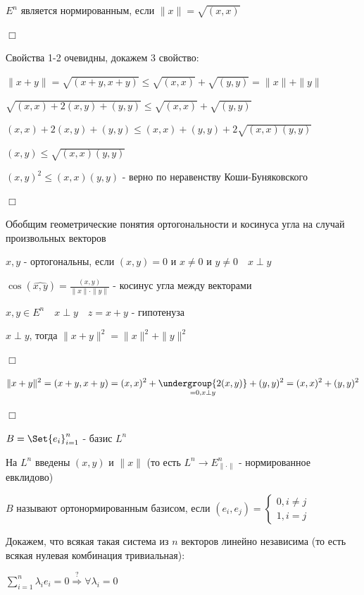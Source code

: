 \documentclass[12pt]{article}
\begin{document}
    \Th $\displaystyle E^n$ является нормированным, если $\|x\| = \sqrt{(x, x)}$

    $\Box$

    Свойства 1-2 очевидны, докажем 3 свойство:

    $\|x + y\| = \sqrt{(x + y, x + y)} \leq \sqrt{(x, x)} + \sqrt{(y, y)} = \|x\| + \|y\|$

    $\sqrt{(x, x) + 2(x, y) + (y, y)} \leq \sqrt{(x, x)} + \sqrt{(y, y)}$

    $(x, x) + 2(x, y) + (y, y) \leq (x, x) + (y, y) + 2\sqrt{(x, x)(y, y)}$

    $(x, y) \leq \sqrt{(x, x)(y, y)}$

    $\displaystyle (x, y)^2 \leq (x, x)(y, y)$ - верно по неравенству Коши-Буняковского

    $\Box$

    Обобщим геометрические понятия ортогональности и косинуса угла на случай произвольных векторов

    \Def $x, y$ - ортогональны, если $(x, y) = 0$ и $x \neq 0$ и $y \neq 0 \quad x \perp y$

    \Def $\displaystyle \cos(\widehat{x, y}) = \frac{(x, y)}{\|x\|\cdot\|y\|}$ - косинус угла между векторами

    \Def $\displaystyle x, y \in E^n \quad x \perp y \quad z = x + y$ - гипотенуза

    \Th $x \perp y$, тогда $\displaystyle \|x + y\|^2 = \|x\|^2 + \|y\|^2$

    $\Box$

    $\displaystyle \|x + y\|^2 = (x + y, x + y) = (x, x)^2 + \underset{= 0, x \perp y}{\undergroup{2(x, y)}} + (y, y)^2 = (x, x)^2 + (y, y)^2$

    $\Box$

    \Def $\displaystyle B = \Set{e_i}_{i=1}^n$ - базис $\displaystyle L^n$

    На $\displaystyle L^n$ введены $(x, y)$ и $\|x\|$ (то есть $\displaystyle L^n \to E^n_{\|\cdot\|}$ - нормированное евклидово)

    $B$ называют ортонормированным базисом, если $\displaystyle (e_i, e_j) = \begin{cases}0, i \neq j \\ 1, i = j\end{cases}$

    \Nota Докажем, что всякая такая система из $n$ векторов линейно независима (то есть всякая нулевая комбинация тривиальная):

    $\displaystyle \sum_{i=1}^n \lambda_i e_i = 0 \stackrel{?}{\Longrightarrow} \forall \lambda_i = 0$
\end{document}
